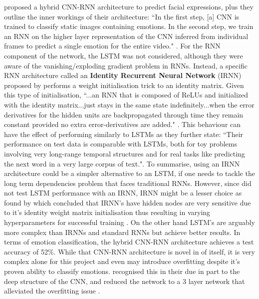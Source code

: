 \documentclass[report, 11pt, oneside]{dissertation}
\begin{document}
\citep{Kahou:2015cr} proposed a hybrid CNN-RNN architecture to predict facial expressions, plus they outline the inner workings of their architecture: ``In the first step, [a] CNN is trained to classify static images containing emotions. In the second step, we train an RNN on the higher layer representation of the CNN inferred from individual frames to predict a single emotion for the entire video." \citep[2]{Kahou:2015cr}. For the RNN component of the network, the LSTM was not considered, although they were aware of the vanishing/exploding gradient problem in RNNs. Instead, a specific RNN architecture called an \textbf{Identity Recurrent Neural Network} (IRNN) proposed by \citep{Le:2015vt} performs a weight initialisation trick to an identity matrix. Given this type of initialisation, ``...an RNN that is composed of ReLUs and initialized with the identity matrix...just stays in the same state indefinitely...when the error derivatives for the hidden units are backpropagated through time they remain constant provided no extra error-derivatives are added." \citep[2]{Le:2015vt}. This behaviour can have the effect of performing similarly to LSTMs as they further state: ``Their performance on test data is comparable with LSTMs, both for toy problems involving very long-range temporal structures and for real tasks like predicting the next word in a very large corpus of text."\citep[2]{Le:2015vt}. To summarise, using an IRNN architecture could be a simpler alternative to an LSTM, if one needs to tackle the long term dependencies problem that faces traditional RNNs. However, since \citep{Kahou:2015cr} did not test LSTM performance with an IRNN, IRNN might be a lesser choice as found by \citeauthor{Talathi:2015uv} which concluded that IRNN's have hidden nodes are very sensitive due to it's identity weight matrix initialisation thus resulting in varying hyperparameters for successful training \citeyearpar{Talathi:2015uv}. On the other hand LSTM's are arguably more complex than IRNNs and standard RNNs but achieve better results. In terms of emotion classification, the hybrid CNN-RNN architecture achieves a test accuracy of 52\%. While that CNN-RNN architecture is novel in of itself, it is very complex alone for this project and even may introduce overfitting despite it's proven ability to classify emotions. \citeauthor{Kahou:2015cr} recognised this in their due in part to the deep structure of the CNN, and reduced the network to a 3 layer network that alleviated the overfitting issue \citeyearpar{Kahou:2015cr}.


\end{document}
